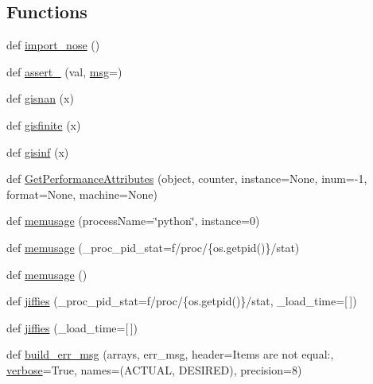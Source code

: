 \subsection*{Functions}
\begin{DoxyCompactItemize}
\item 
def \hyperlink{namespacenumpy_1_1testing_1_1__private_1_1utils_af4a22ba8893271359ffa7f6609bbd824}{import\+\_\+nose} ()
\item 
def \hyperlink{namespacenumpy_1_1testing_1_1__private_1_1utils_aef78341a61b848b85378ec73fa2200d0}{assert\+\_\+} (val, \hyperlink{namespacenumpy_ab96122eb8e44294b488b0ef93ec27d38}{msg}=\textquotesingle{}\textquotesingle{})
\item 
def \hyperlink{namespacenumpy_1_1testing_1_1__private_1_1utils_ad6d5793b0f5aae0566abcfe2c1b6be93}{gisnan} (x)
\item 
def \hyperlink{namespacenumpy_1_1testing_1_1__private_1_1utils_a760e65e6b10227d9e769e4389ddd88cf}{gisfinite} (x)
\item 
def \hyperlink{namespacenumpy_1_1testing_1_1__private_1_1utils_a38c10a33a076c0f16003c8d9e4beeaf4}{gisinf} (x)
\item 
def \hyperlink{namespacenumpy_1_1testing_1_1__private_1_1utils_aa9fa75b68f1990888596f7b60932fc49}{Get\+Performance\+Attributes} (object, counter, instance=None, inum=-\/1, format=None, machine=None)
\item 
def \hyperlink{namespacenumpy_1_1testing_1_1__private_1_1utils_a80333a719dea3a9d4215814dffaf10dc}{memusage} (process\+Name=\char`\"{}python\char`\"{}, instance=0)
\item 
def \hyperlink{namespacenumpy_1_1testing_1_1__private_1_1utils_a13bb93e204bc1afe5522de6eed6d07cc}{memusage} (\+\_\+proc\+\_\+pid\+\_\+stat=f\textquotesingle{}/proc/\{os.\+getpid()\}/stat\textquotesingle{})
\item 
def \hyperlink{namespacenumpy_1_1testing_1_1__private_1_1utils_a6cae776794489e38592e1aa3fefe83cc}{memusage} ()
\item 
def \hyperlink{namespacenumpy_1_1testing_1_1__private_1_1utils_a2402f5aaa73b77dd2113320cac0ffb4e}{jiffies} (\+\_\+proc\+\_\+pid\+\_\+stat=f\textquotesingle{}/proc/\{os.\+getpid()\}/stat\textquotesingle{}, \+\_\+load\+\_\+time=\mbox{[}$\,$\mbox{]})
\item 
def \hyperlink{namespacenumpy_1_1testing_1_1__private_1_1utils_aeb462e79e70ba8f234721759fdac346a}{jiffies} (\+\_\+load\+\_\+time=\mbox{[}$\,$\mbox{]})
\item 
def \hyperlink{namespacenumpy_1_1testing_1_1__private_1_1utils_aeb0b7d37f6998658b37b4c940107b82b}{build\+\_\+err\+\_\+msg} (arrays, err\+\_\+msg, header=\textquotesingle{}Items are not equal\+:\textquotesingle{}, \hyperlink{namespacenumpy_1_1testing_1_1__private_1_1utils_a4c0b8d13ca08494290635e712a0e8715}{verbose}=True, names=(\textquotesingle{}A\+C\+T\+U\+AL\textquotesingle{}, \textquotesingle{}D\+E\+S\+I\+R\+ED\textquotesingle{}), precision=8)

\end{DoxyCompactItemize}
